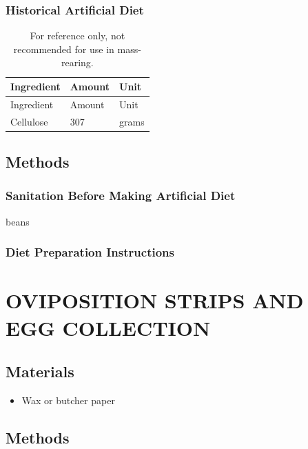 \documentclass{sop_class}[overrideChapters] %
\providecommand{\tightlist}{%
  \setlength{\itemsep}{0pt}\setlength{\parskip}{0pt}}
\begin{document}
{\clearpage
\newpage

\hypertarget{old-diet}{%
\subsection{Historical Artificial Diet}\label{old-diet}}
\begin{longtable}[]{@{}lll@{}}
\caption{For reference only, not recommended for use in mass-rearing.}\tabularnewline
\toprule()
Ingredient & Amount & Unit \\
\midrule()
\endfirsthead
\toprule()
Ingredient & Amount & Unit \\
\midrule()
\endhead
Cellulose & 307 & grams \\
\bottomrule()
\end{longtable}
\hypertarget{methods-1}{%
\section{Methods}\label{methods-1}}

\hypertarget{pre-sanitation}{%
\subsection{Sanitation Before Making Artificial Diet}\label{pre-sanitation}}

beans

\hypertarget{diet-prep}{%
\subsection{Diet Preparation Instructions}\label{diet-prep}}

\hypertarget{paper-strips}{%
\chapter{OVIPOSITION STRIPS AND EGG COLLECTION}\label{paper-strips}}

\hypertarget{materials-2}{%
\section{Materials}\label{materials-2}}
\begin{itemize}
\tightlist
\item
  Wax or butcher paper
\end{itemize}
\hypertarget{methods-2}{%
\section{Methods}\label{methods-2}}

}
\end{document}
